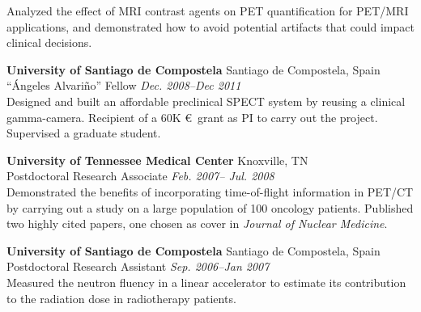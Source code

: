 \documentclass[letterpaper]{article}
\begin{document}
\begin{description}
Analyzed the effect of MRI contrast agents on PET quantification for PET/MRI
applications, and demonstrated how to avoid potential artifacts that could impact clinical decisions.



\item[]
    \textbf{University of Santiago de Compostela} \hfill Santiago de
    Compostela, Spain
\\
    ``\'Angeles Alvari\~no'' Fellow \hfill \textit{Dec. 2008--Dec 2011}
\vspace*{0.5ex}
    \\
    Designed and built an affordable preclinical SPECT system by reusing a
    clinical gamma-camera. Recipient of a 60K \euro~grant as PI to carry out
    the project. Supervised a graduate student. 
    


\item[]
    \textbf{University of Tennessee Medical Center} \hfill Knoxville, TN
\\
Postdoctoral Research Associate \hfill \textit{Feb. 2007-- Jul. 2008} 
\vspace*{0.5ex}
\\
Demonstrated the benefits of incorporating time-of-flight information in PET/CT
by carrying out a study on a large population of 100 oncology patients. Published
two highly cited papers, one chosen as cover in \textit{Journal of Nuclear Medicine}.

\item[]
    \textbf{University of Santiago de Compostela} \hfill Santiago de
    Compostela, Spain
\\
    Postdoctoral Research Assistant \hfill \textit{Sep. 2006--Jan 2007}
\vspace*{0.5ex}
    \\
    Measured the neutron fluency in a linear accelerator to estimate its
    contribution to the radiation dose in radiotherapy patients.


\end{description}
\end{document}
